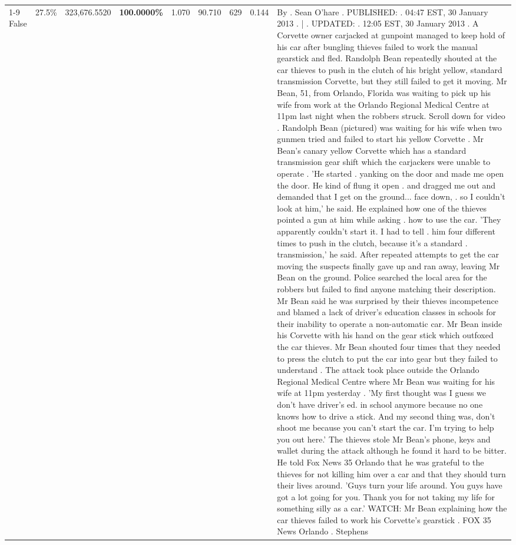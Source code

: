 \begin{table}[H]
\begin{tabular}{lllrlllll}
\cline{1-9} \cline{2-9}
False & 27.5\% & 323,676.5520 & \bfseries \color{red} 100.0000\% & 1.070 & 90.710 & 629 & 0.144 & By . Sean O'hare . PUBLISHED: . 04:47 EST, 30 January 2013 . | . UPDATED: . 12:05 EST, 30 January 2013 . A Corvette owner carjacked at gunpoint managed to keep hold of his car after bungling thieves failed to work the manual gearstick and fled. Randolph Bean repeatedly shouted at the car thieves to push in the clutch of his bright yellow, standard transmission Corvette, but they still failed to get it moving. Mr Bean, 51, from Orlando, Florida was waiting to pick up his wife from work at the Orlando Regional Medical Centre at 11pm last night when the robbers struck. Scroll down for video . Randolph Bean (pictured) was waiting for his wife when two gunmen tried and failed to start his yellow Corvette . Mr Bean's canary yellow Corvette which has a standard transmission gear shift which the carjackers were unable to operate . 'He started . yanking on the door and made me open the door. He kind of flung it open . and dragged me out and demanded that I get on the ground... face down, . so I couldn't look at him,' he said. He explained how one of the thieves pointed a gun at him while asking . how to use the car. 'They apparently couldn't start it. I had to tell . him four different times to push in the clutch, because it's a standard . transmission,' he said. After repeated attempts to get the car moving the suspects finally gave up and ran away, leaving Mr Bean on the ground. Police searched the local area for the robbers but failed to find anyone matching their description. Mr Bean said he was surprised by their thieves incompetence and blamed a lack of driver's education classes in schools for their inability to operate a non-automatic car. Mr Bean inside his Corvette with his hand on the gear stick which outfoxed the car thieves. Mr Bean shouted four times that they needed to press the clutch to put the car into gear but they failed to understand . The attack took place outside the Orlando Regional Medical Centre where Mr Bean was waiting for his wife at 11pm yesterday . 'My first thought was I guess we don't have driver's ed. in school anymore because no one knows how to drive a stick. And my second thing was, don't shoot me because you can't start the car. I'm trying to help you out here.' The thieves stole Mr Bean's phone, keys and wallet during the attack although he found it hard to be bitter. He told Fox News 35 Orlando that he was grateful to the thieves for not killing him over a car and that they should turn their lives around. 'Guys turn your life around. You guys have got a lot going for you. Thank you for not taking my life for something silly as a car.' WATCH: Mr Bean explaining how the car thieves failed to work his Corvette's gearstick . FOX 35 News Orlando . Stephens \\

\end{tabular}
\end{table}
